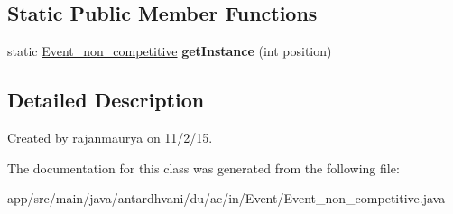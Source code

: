 \subsection*{Static Public Member Functions}
\begin{DoxyCompactItemize}
\item 
\hypertarget{classantardhvani_1_1du_1_1ac_1_1in_1_1_event_1_1_event__non__competitive_a67f4e21525833851067c5546d1a2d38d}{}static \hyperlink{classantardhvani_1_1du_1_1ac_1_1in_1_1_event_1_1_event__non__competitive}{Event\+\_\+non\+\_\+competitive} {\bfseries get\+Instance} (int position)\label{classantardhvani_1_1du_1_1ac_1_1in_1_1_event_1_1_event__non__competitive_a67f4e21525833851067c5546d1a2d38d}

\end{DoxyCompactItemize}


\subsection{Detailed Description}
Created by rajanmaurya on 11/2/15. 

The documentation for this class was generated from the following file\+:\begin{DoxyCompactItemize}
\item 
app/src/main/java/antardhvani/du/ac/in/\+Event/Event\+\_\+non\+\_\+competitive.\+java\end{DoxyCompactItemize}

